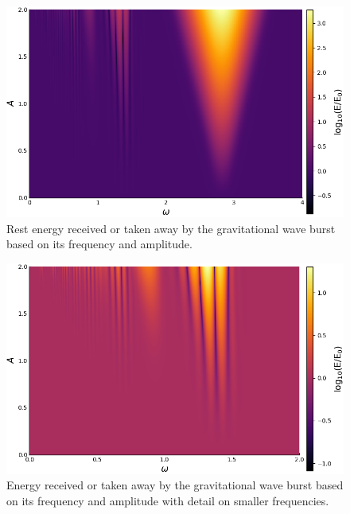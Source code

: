\begin{figure}[p]
    \centering
    \includegraphics[width=1.0 \textwidth]{pictures/grav_energy.png}
    \caption{Rest energy received or taken away by the gravitational wave burst based on its frequency and amplitude.}
    \label{fig:grav_energy}
\end{figure}

\begin{figure}[p]
	\centering
	\includegraphics[width=1.0 \textwidth]{pictures/grav_energy_small.png}
	\caption{Energy received or taken away by the gravitational wave burst based on its frequency and amplitude with detail on smaller frequencies.}
	\label{fig:grav_energy_small}
\end{figure}


